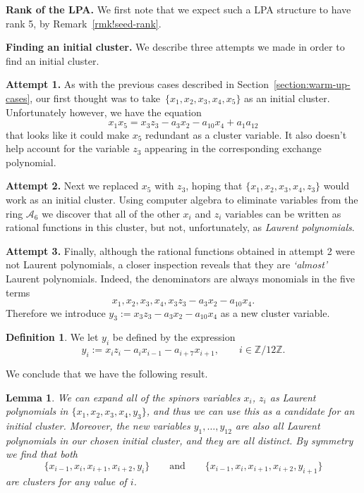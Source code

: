 \documentclass[pdftex]{sigma}
\numberwithin{equation}{section}
\newtheorem{lem}[thm]{Lemma}
\theoremstyle{definition}
\newtheorem{defn}[thm]{Definition}
\newcommand{\ZZ}{\mathbb{Z}}
\begin{document}
{\bf Rank of the LPA.}
We first note that we expect such a LPA structure to have rank 5, by Remark~\ref{rmk!seed-rank}.

{\bf Finding an initial cluster.}
We describe three attempts we made in order to find an initial cluster.

{\bf Attempt 1.}
As with the previous cases described in Section~\ref{section:warm-up-cases}, our first thought was to take~${\{x_1,x_2,x_3,x_4,x_5\}}$ as an initial cluster. Unfortunately however, we have the equation
\[x_1x_5 = x_3z_3 - a_3x_2 - a_{10}x_4 + a_1a_{12} \]
that looks like it could make $x_5$ redundant as a cluster variable. It also doesn't help account for the variable $z_3$ appearing in the corresponding exchange polynomial.

{\bf Attempt 2.}
Next we replaced $x_5$ with $z_3$, hoping that $\{x_1,x_2,x_3,x_4,z_3\}$ would work as an initial cluster. Using computer algebra to eliminate variables from the ring $\mathcal A_6$ we discover that all of the other $x_i$ and $z_i$ variables can be written as rational functions in this cluster, but not, unfortunately, as \emph{Laurent polynomials}.

{\bf Attempt 3.}
Finally, although the rational functions obtained in attempt 2 were not Laurent polynomials, a closer inspection reveals that they are \emph{`almost'} Laurent polynomials. Indeed, the denominators are always monomials in the five terms
\[ x_1, x_2, x_3, x_4, x_3z_3 - a_3x_2 - a_{10}x_4. \]
Therefore we introduce $y_3:=x_3z_3 - a_3x_2 - a_{10}x_4$ as a new cluster variable.

\begin{defn}
We let $y_i$ be defined by the expression
\[ y_i := x_iz_i-a_ix_{i-1}-a_{i+7}x_{i+1}, \qquad i\in \ZZ/12\ZZ. \]
\end{defn}

We conclude that we have the following result.

\begin{lem}
We can expand all of the spinors variables $x_i$, $z_i$ as Laurent polynomials in $\{x_1,x_2,x_3,x_4,y_3\}$, and thus we can use this as a candidate for an initial cluster. Moreover, the new variables $y_1,\ldots,y_{12}$ are also all Laurent polynomials in our chosen initial cluster, and they are all distinct. By symmetry we find that both
\[ \{ x_{i-1},x_i,x_{i+1},x_{i+2}, y_i \} \qquad \text{and} \qquad \{ x_{i-1},x_i,x_{i+1},x_{i+2}, y_{i+1} \} \]
are clusters for any value of $i$.
\end{lem}
\end{document}
